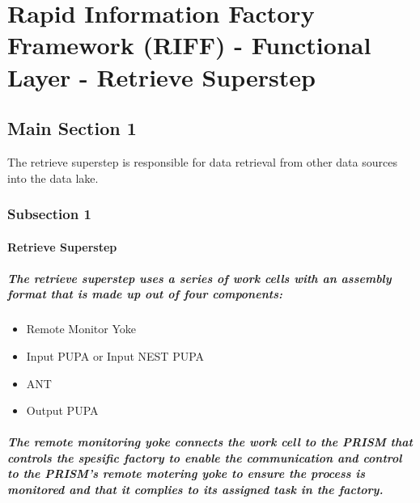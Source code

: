 
\chapter{Rapid Information Factory Framework (RIFF) - Functional Layer - Retrieve Superstep} %

\label{Chapter11} %



\section{Main Section 1}

The retrieve superstep is responsible for data retrieval from other data sources into the data lake.

\subsection{Subsection 1}

\subsubsection{Retrieve Superstep}
\paragraph{The retrieve superstep uses a series of work cells with an assembly format that is made up out of four components:}
\begin{itemize}
\item{Remote Monitor Yoke}
\item{Input PUPA or Input NEST PUPA}
\item{ANT}
\item{Output PUPA}
\end{itemize}
\paragraph{The remote monitoring yoke connects the work cell to the PRISM that controls the spesific factory to enable the communication and control to the PRISM's remote motering yoke to ensure the process is monitored and that it complies to its assigned task in the factory.}
